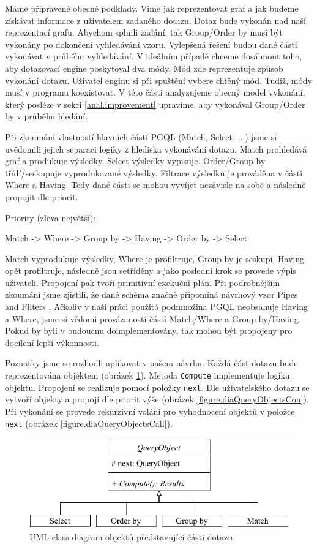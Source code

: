 Máme připravené obecné podklady.
Víme jak reprezentovat graf a jak budeme získávat informace z uživatelem zadaného dotazu.
Dotaz bude vykonán nad naší reprezentací grafu.
Abychom splnili zadání, tak Group/Order by musí být vykonány po dokončení vyhledávání vzoru.
Vylepšená řešení budou dané části vykonávat v průběhu vyhledávání.
V ideálním případě chceme dosáhnout toho, aby dotazovací engine poskytoval dva módy.
Mód zde reprezentuje způsob vykonání dotazu.
Uživatel enginu si při spuštění vybere chtěný mód.
Tudíž, módy musí v programu koexistovat.
V této části analyzujeme obecný model vykonání, který posléze v sekci \ref{anal.improvement} upravíme, aby vykonával Group/Order by v průběhu hledání.

Při zkoumání vlastností hlavních částí PGQL (Match, Select, ...) jsme si uvědomili jejich separaci logiky z hlediska vykonávání dotazu.
Match prohledává graf a produkuje výsledky. 
Select výsledky vypisuje. 
Order/Group by třídí/seskupuje vyprodukované výsledky.
Filtrace výsledků je prováděna v části Where a Having.
Tedy dané části se mohou vyvíjet nezávisle na sobě a následně propojit dle priorit.

Priority (zleva největší):
\begin{code}
      Match -> Where -> Group by -> Having -> Order by -> Select 
\end{code}
Match vyprodukuje výsledky, Where je profiltruje, Group by je seskupí, Having opět profiltruje, následně jsou setříděny a jako poslední krok se provede výpis uživateli.
Propojení pak tvoří primitivní exekuční plán.
Při podrobnějším zkoumání jsme zjistili, že dané schéma značně připomíná návrhový vzor Pipes and Filters \citep[str. 53]{patterns2}.
Ačkoliv v naší práci použitá podmnožina PGQL neobsahuje Having a Where, jsme si vědomi provázanosti částí Match/Where a Group by/Having.
Pokud by byli v budoucnu doimplementovány, tak mohou být propojeny pro docílení lepší výkonnosti. 

Poznatky jsme se rozhodli aplikovat v našem návrhu.
Každá část dotazu bude reprezentována objektem (obrázek \ref{figure.diaQueryObjects}).
Metoda \verb+Compute+ implementuje logiku objektu.
Propojení se realizuje pomocí položky \verb+next+.
Dle uživatelského dotazu se vytvoří objekty a propojí dle priorit výše (obrázek \ref{figure.diaQueryObjectsCon}).
Při vykonání se provede rekurzivní voláni pro vyhodnocení objektů v položce \verb+next+ (obrázek \ref{figure.diaQueryObjectsCall}). 

\begin{figure}[!htp]
\includegraphics{../img/diaQueryObjects.pdf}\centering
\caption{UML class diagram objektů představující části dotazu.}
\label{figure.diaQueryObjects}
\end{figure}

